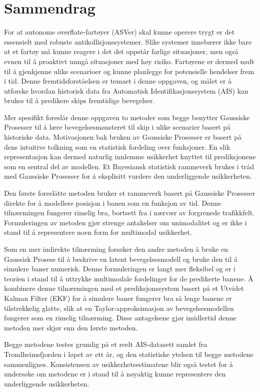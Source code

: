 \chapter*{Sammendrag}
For at autonome overflate-fartøyer (ASVer) skal kunne operere trygt er det essensielt med robuste antikollisjonssystemer. Slike systemer innebærer ikke bare at et fartøy må kunne reagere i det det oppstår farlige situasjoner, men også evnen til å proaktivt unngå situasjoner med høy risiko. Fartøyene er dermed nødt til å gjenkjenne ulike scenarioer og kunne planlegge for potensielle hendelser frem i tid. Denne fremtidsforståelsen er temaet i denne oppgaven, og målet er å utforske hvordan historisk data fra Automatisk Identifikasjonssystem (AIS) kan brukes til å predikere skips fremtidige bevegelser.

Mer spesifikt foreslår denne oppgaven to metoder som begge benytter Gaussiske Prosesser til å lære bevegelsesmønsteret til skip i ulike scenarier basert på historiske data. Motivasjonen bak bruken av Gaussiske Prosesser er basert på dens intuitive tolkning som en statistisk fordeling over funksjoner. En slik representasjon kan dermed naturlig innlemme usikkerhet knyttet til prediksjonene som en sentral del av modellen. Et Bayesiansk statistisk rammeverk brukes i tråd med Gaussiske Prosesser for å eksplisitt vurdere den underliggende usikkerheten.

Den første foreslåtte metoden bruker et rammeverk basert på Gaussiske Prosesser direkte for å modellere posisjon i banen som en funksjon av tid. Denne tilnærmingen fungerer rimelig bra, bortsett fra i nærvær av forgrenede trafikkfelt. Formuleringen av metoden gjør strenge antakelser om unimodalitet og er ikke i stand til å representere noen form for multimodal usikkerhet.

Som en mer indirekte tilnærming forsøker den andre metoden å bruke en Gaussisk Prosess til å beskrive en latent bevegelsesmodell og bruke den til å simulere baner numerisk. Denne formuleringen er langt mer fleksibel og er i teorien i stand til å uttrykke multimodale fordelinger for de predikerte banene. Å kombinere denne tilnærmingen med et prediksjonssystem basert på et Utvidet Kalman Filter (EKF) for å simulere baner fungerer bra så lenge banene er tilstrekkelig glatte, slik at en Taylor-approksimasjon av bevegelsesmodellen fungerer som en rimelig tilnærming. Disse antagelsene gjør imidlertid denne metoden mer skjør enn den første metoden.

Begge metodene testes grundig på et reelt AIS-datasett samlet fra Trondheimsfjorden i løpet av ett år, og den statistiske ytelsen til begge metodene sammenlignes. Konsistensen av usikkerhetsestimatene blir også testet for å undersøke om metodene er i stand til å nøyaktig kunne representere den underliggende usikkerheten.





